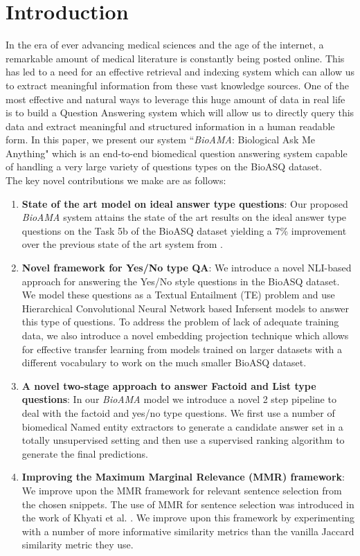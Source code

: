 \documentclass[11pt,a4paper]{article}
\begin{document}
\section{Introduction}
In the era of ever advancing medical sciences and the age of the internet, a remarkable amount of medical literature is constantly being posted online. This has led to a need for an effective retrieval and indexing system which can allow us to extract meaningful information from these vast knowledge sources. One of the most effective and natural ways to leverage this huge amount of data in real life is to build a Question Answering system which will allow us to directly query this data and extract meaningful and structured information in a human readable form. In this paper, we present our system ``\textit{BioAMA}: Biological Ask Me Anything" which is an end-to-end biomedical question answering system capable of handling a very large variety of questions types on the BioASQ dataset.  \\
The key novel contributions we make are as follows:
\begin{enumerate}
    \item \textbf{State of the art model on ideal answer type questions}: Our proposed \textit{BioAMA} system attains the state of the art results on the ideal answer type questions on the Task 5b of the BioASQ dataset yielding a 7\%  improvement over the previous state of the art system from \cite{khyati-paper}.
    \item \textbf{Novel framework for Yes/No type QA}: 
    We introduce a novel NLI-based approach for answering the Yes/No style questions in the BioASQ dataset. We model these questions as a Textual Entailment (TE) problem and use Hierarchical Convolutional Neural Network based Infersent models \cite{Infersent} to answer this type of questions. To address the problem of lack of adequate training data, we also introduce a novel embedding projection technique which allows for effective transfer learning from models trained on larger datasets with a different vocabulary to work on the much smaller BioASQ dataset.
    \item \textbf{A novel two-stage approach to answer Factoid and List type questions}: 
    In our \textit{BioAMA} model we introduce a novel 2 step pipeline to deal with the factoid and yes/no type questions. We first use a number of biomedical Named entity extractors to generate a candidate answer set in a totally unsupervised setting and then use a supervised ranking algorithm to generate the final predictions.
    \item \textbf{Improving the Maximum Marginal Relevance (MMR) framework}: We improve upon the MMR framework for relevant sentence selection from the chosen snippets. The use of MMR for sentence selection was introduced in the work of Khyati et al. . We improve upon this framework by experimenting with a number of more informative similarity metrics than the vanilla Jaccard similarity metric they use.

\end{enumerate}
\end{document}

